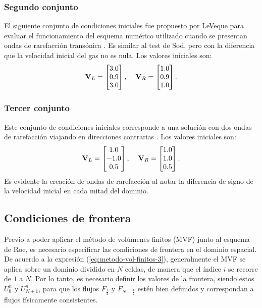 \subsubsection{Segundo conjunto}
El siguiente conjunto de condiciones iniciales fue propuesto por LeVeque para evaluar el funcionamiento del esquema numérico utilizado cuando se presentan ondas de rarefacción transónica \cite{pelanti}. Es similar al test de Sod, pero con la diferencia que la velocidad inicial del gas no es nula. Los valores iniciales son:
\begin{equation}
	\mathbf{V}_L = 
	\begin{bmatrix}
		3.0\\
		0.9\\
		3.0
	\end{bmatrix},\hspace{4mm}
	\mathbf{V}_R = 
	\begin{bmatrix}
		1.0\\
		0.9\\
		1.0
	\end{bmatrix}.
\end{equation}
\subsubsection{Tercer conjunto}
Este conjunto de condiciones iniciales corresponde a una solución con dos ondas de rarefacción viajando en direcciones contrarias \cite{thesis-euler-godunov}. Los valores iniciales son:
\begin{equation}
	\mathbf{V}_L = 
	\begin{bmatrix}
		1.0\\
		-1.0\\
		0.5
	\end{bmatrix},\hspace{4mm}
	\mathbf{V}_R = 
	\begin{bmatrix}
		1.0\\
		1.0\\
		0.5
	\end{bmatrix}.
\end{equation}
Es evidente la creación de ondas de rarefacción al notar la diferencia de signo de la velocidad inicial en cada mitad del dominio.
\subsection{Condiciones de frontera}
Previo a poder aplicar el método de volúmenes finitos (MVF) junto al esquema de Roe, es necesario especificar las condiciones de frontera en el dominio espacial.
De acuerdo a la expresión (\ref{eq:metodo-vol-finitos-3}), generalmente el MVF se aplica sobre un dominio dividido en $N$ celdas, de manera que el índice $i$ se recorre de $1$ a $N$. Por lo tanto, es necesario definir los valores de la frontera, siendo estos $U_{0}^{n}$ y $U_{N+1}^{n}$, para que los flujos $F_{\frac{1}{2}}$ y $F_{N+\frac{1}{2}}$ estén bien definidos y correspondan a flujos físicamente consistentes.
